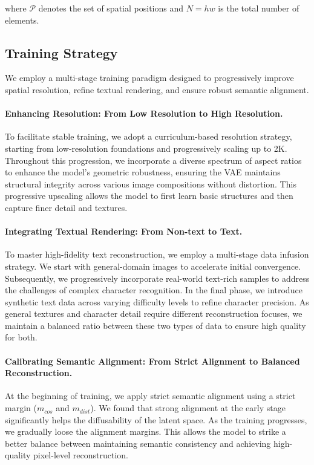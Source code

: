 \documentclass{llmxive}
\begin{document}
where $\mathcal{P}$ denotes the set of spatial positions and $N=hw$ is the total number of elements.



\subsection{Training Strategy}
We employ a multi-stage training paradigm designed to progressively improve spatial resolution, refine textual rendering, and ensure robust semantic alignment. 


\paragraph{Enhancing Resolution: From Low Resolution to High Resolution.} 
To facilitate stable training, we adopt a curriculum-based resolution strategy, starting from low-resolution foundations and progressively scaling up to 2K. Throughout this progression, we incorporate a diverse spectrum of aspect ratios to enhance the model's geometric robustness, ensuring the VAE maintains structural integrity across various image compositions without distortion. This progressive upscaling allows the model to first learn basic structures and then capture finer detail and textures.

\paragraph{Integrating Textual Rendering: From Non-text to Text.} 
To master high-fidelity text reconstruction, we employ a multi-stage data infusion strategy. We start with general-domain images to accelerate initial convergence. Subsequently, we progressively incorporate real-world text-rich samples to address the challenges of complex character recognition. In the final phase, we introduce synthetic text data across varying difficulty levels to refine character precision. As general textures and character detail require different reconstruction focuses, we maintain a balanced ratio between these two types of data to ensure high quality for both.

\paragraph{Calibrating Semantic Alignment: From Strict Alignment to Balanced Reconstruction.} 
At the beginning of training, we apply strict semantic alignment using a strict margin ($m_{cos}$ and $m_{dist}$). We found that strong alignment at the early stage significantly helps the diffusability of the latent space. As the training progresses, we gradually loose the alignment margins. This allows the model to strike a better balance between maintaining semantic consistency and achieving high-quality pixel-level reconstruction.
\end{document}
